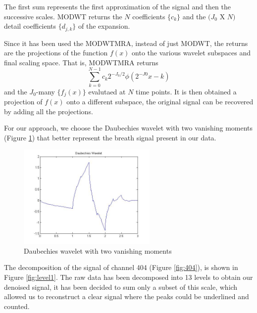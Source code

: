 The first sum represents the first approximation of the signal and then the successive scales.
MODWT returns the $N$ coefficients $\{c_k\}$ and the $(J_0 $ X $ N)$ detail coefficients $\{d_{j,k}\}$ of the expansion. 

Since it has been used the MODWTMRA, instead of just MODWT, the returns are the projections of the function $f(x)$ onto the various wavelet subspaces and final scaling space. That is, MODWTMRA returns 
$$\sum_{k=0}^{N-1} c_k 2^{-J_0/2} \phi(2^{-J0}x-k)$$\newline
and the $J_0$-many $\{f_j(x)\}$ evalutaed at $N$ time points.
It is then obtained a projection of $f(x)$ onto a different subspace, the original signal can be recovered by adding all the projections. 

For our approach, we choose the Daubechies wavelet with two vanishing moments (Figure \ref{fig:Daubechies}) that better represent the breath signal present in our data.

\begin{figure}[h]
    \centering
    \includegraphics[width=0.6\textwidth]{img/gooddb.jpeg}
    \caption{Daubechies wavelet with two vanishing moments}
    \label{fig:Daubechies}
\end{figure}


The decomposition of the signal of channel 404 (Figure \ref{fig:404}), is shown in Figure \ref{fig:level1}. The raw data has been decomposed into 13 levels to obtain our denoised signal, it has been decided to sum only a subset of this scale, which allowed us to reconstruct a clear signal where the peaks could be underlined and counted. 

